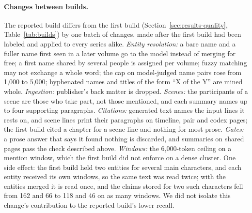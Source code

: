 \paragraph{Changes between builds.} The reported build differs from the first
build (Section~\ref{sec:results-quality}, Table~\ref{tab:builds}) by one batch of changes,
made after the first build had been labeled and applied to every series alike.
\emph{Entity resolution:} a bare name and a fuller name first seen in a later volume go to
the model instead of merging for free; a first name shared by several people is assigned per
volume; fuzzy matching may not exchange a whole word; the cap on model-judged name pairs
rose from 1{,}000 to 5{,}000; hyphenated names and titles of the form ``X of the Y'' are
mined whole. \emph{Ingestion:} publisher's back matter is dropped. \emph{Scenes:} the
participants of a scene are those who take part, not those mentioned, and each summary names
up to four supporting paragraphs. \emph{Citations:} generated text names the input lines it
rests on, and scene lines print their paragraphs on timeline, pair and codex pages; the first
build cited a chapter for a scene line and nothing for most prose. \emph{Gates:} a prose
answer that says it found nothing is discarded, and summaries on shared pages pass the check
described above. \emph{Windows:} the 6{,}000-token ceiling on a mention window, which the
first build did not enforce on a dense cluster. One side effect: the first
build held two entities for several main characters, and each entity received its own
windows, so the same text was read twice; with the entities merged it is read once, and the
claims stored for two such characters fell from 162 and 66 to 118 and 46 on as many windows.
We did not isolate this change's contribution to the reported build's lower recall.
